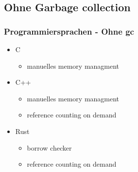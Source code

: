 \documentclass{beamer}
\begin{document}
        \subsection{Ohne Garbage collection}
            \begin{frame}
                \frametitle{Programmiersprachen - Ohne gc}

                \begin{itemize}
                    \item C
                    \begin{itemize}
                        \item manuelles memory managment
                    \end{itemize}
                    \item C++
                    \begin{itemize}
                        \item manuelles memory managment
                        \item reference counting on demand
                    \end{itemize}
                    \item Rust
                    \begin{itemize}
                        \item borrow checker
                        \item reference counting on demand
                    \end{itemize}
                \end{itemize}
            \end{frame}
\end{document}

